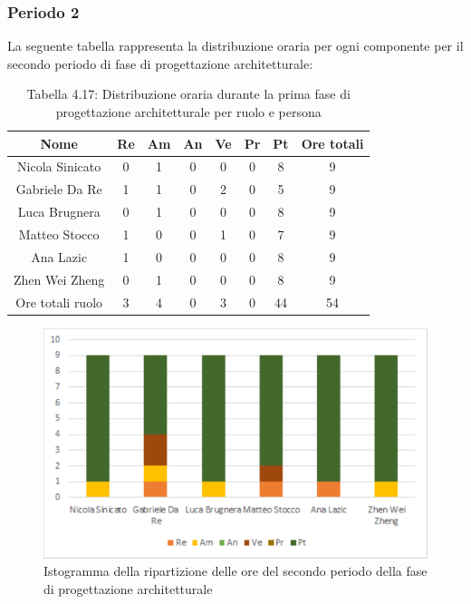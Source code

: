 \subsubsection{Periodo 2}
%
La seguente tabella rappresenta la distribuzione oraria per ogni componente per il secondo periodo di fase di progettazione architetturale:
\begin{table}[h]
	\setlength\extrarowheight{5pt}
	\centering
	\begin{tabularx}{\textwidth}{|ccccccc|c|}
		\hline
		\rowcolor{white}
		\textbf{Nome} & \textbf{Re} & \textbf{Am} & \textbf{An} & \textbf{Ve} & \textbf{Pr}& \textbf{Pt} & \textbf{Ore totali} \\
		\hline
		Nicola Sinicato &0&1&0&0&0&8&9 \\
		Gabriele Da Re &1&1&0&2&0&5&9 \\
		Luca Brugnera &0&1&0&0&0&8&9 \\
		Matteo Stocco &1&0&0&1&0&7&9 \\
		Ana Lazic &1&0&0&0&0&8&9 \\
		Zhen Wei Zheng &0&1&0&0&0&8&9 \\
		\hline
		Ore totali ruolo &3&4&0&3&0&44&54 \\
		\hline
	\end{tabularx}
	\vspace{10pt}
	\caption{Tabella 4.17: Distribuzione oraria durante la prima fase di progettazione architetturale per ruolo e persona}
\end{table}
\begin{figure}[H]
    \centering
    \includegraphics[scale=0.6]{img/grafi preventivo/istogrammi/architetturale/periodo2.png}
    \caption{Istogramma della ripartizione delle ore del secondo periodo della fase di progettazione architetturale}
\end{figure}
